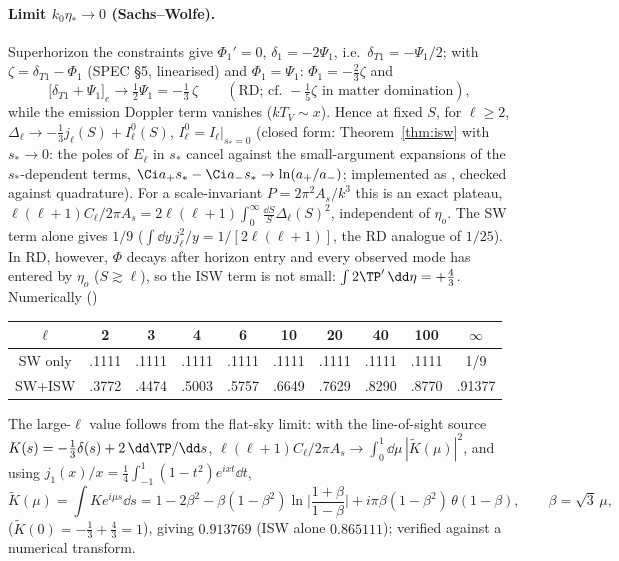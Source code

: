 \paragraph{Limit $k_0\eta_*\to0$ (Sachs--Wolfe).}  Superhorizon the constraints give $\Phi_1'=0$, $\delta_1=-2\Psi_1$, i.e.\
$\delta_{T1}=-\Psi_1/2$; with $\zeta=\delta_{T1}-\Phi_1$ (SPEC \S5, linearised) and $\Phi_1=\Psi_1$: $\Phi_1=-\tfrac23\zeta$ and
\begin{equation}
\big[\delta_{T1}+\Psi_1\big]_e\to\tfrac12\Psi_1=-\tfrac13\,\zeta\qquad(\text{RD; cf.\ }-\tfrac15\zeta\text{ in matter domination}),
\end{equation}
while the emission Doppler term vanishes ($kT_V\sim x$).  Hence at fixed $S$, for $\ell\ge2$,
$\Delta_\ell\to-\tfrac13j_\ell(S)+I^0_\ell(S)$, $I^0_\ell=I_\ell|_{s_*=0}$ (closed form: Theorem~\ref{thm:isw} with
$s_*\to0$: the poles of $E_\ell$ in $s_*$ cancel against the small-argument expansions of the $s_*$-dependent terms,
$\Ci a_+s_*-\Ci a_-s_*\to\ln(a_+/a_-)$; implemented as \code{I\_l\_closed\_eta0}, checked against quadrature).
For a scale-invariant $P=2\pi^2A_s/k^3$ this is an exact plateau, $\ell(\ell+1)C_\ell/2\pi A_s=2\ell(\ell+1)\int_0^\infty\frac{\dd S}{S}\Delta_\ell(S)^2$,
independent of $\eta_o$.  The SW term alone gives $1/9$ ($\int\dd y\,j_\ell^2/y=1/[2\ell(\ell+1)]$, the RD analogue of $1/25$).
In RD, however, $\Phi$ decays after horizon entry and every observed mode has entered by $\eta_o$ ($S\gtrsim\ell$), so the ISW term is
not small: $\int2\TP'\,\dd\eta=+\tfrac43$.  Numerically (\code{plateau\_isw.py})
\begin{center}
\begin{tabular}{c|ccccccccc}
$\ell$ & 2 & 3 & 4 & 6 & 10 & 20 & 40 & 100 & $\infty$\\\hline
SW only & .1111 & .1111 & .1111 & .1111 & .1111 & .1111 & .1111 & .1111 & 1/9\\
SW+ISW & .3772 & .4474 & .5003 & .5757 & .6649 & .7629 & .8290 & .8770 & .91377
\end{tabular}
\end{center}
The large-$\ell$ value follows from the flat-sky limit: with the line-of-sight source $K(s)=-\tfrac13\delta(s)+2\,\dd\TP/\dd s$,
$\ell(\ell+1)C_\ell/2\pi A_s\to\int_0^1\dd\mu\,|\tilde K(\mu)|^2$, and using $j_1(x)/x=\frac14\int_{-1}^1(1-t^2)e^{ixt}\dd t$,
\begin{equation}
\tilde K(\mu)=\int K e^{i\mu s}\dd s=1-2\beta^2-\beta(1-\beta^2)\ln\Big|\frac{1+\beta}{1-\beta}\Big|+i\pi\beta(1-\beta^2)\,\theta(1-\beta),\qquad\beta=\sqrt3\,\mu ,
\end{equation}
($\tilde K(0)=-\tfrac13+\tfrac43=1$), giving $0.913769$ (ISW alone $0.865111$); verified against a numerical transform.

